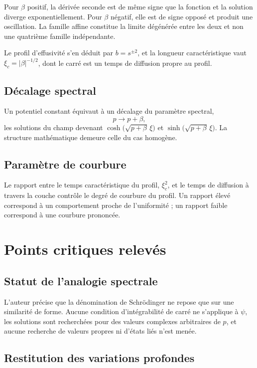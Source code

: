 \documentclass[11pt,a4paper]{article}
\begin{document}
Pour $\beta$ positif, la dérivée seconde est de même signe que la fonction et la solution diverge
exponentiellement. Pour $\beta$ négatif, elle est de signe opposé et produit une oscillation. La
famille affine constitue la limite dégénérée entre les deux et non une quatrième famille indépendante.

Le profil d'effusivité s'en déduit par $b = s^{\pm 2}$, et la longueur caractéristique vaut
$\xi_{c} = |\beta|^{-1/2}$, dont le carré est un temps de diffusion propre au profil.

\subsection{Décalage spectral}

Un potentiel constant équivaut à un décalage du paramètre spectral,
\[ p \longrightarrow p + \beta , \]
les solutions du champ devenant $\cosh\bigl(\sqrt{p+\beta}\,\xi\bigr)$ et
$\sinh\bigl(\sqrt{p+\beta}\,\xi\bigr)$. La structure mathématique demeure celle du cas homogène.

\subsection{Paramètre de courbure}

Le rapport entre le temps caractéristique du profil, $\xi_{c}^{2}$, et le temps de diffusion à travers
la couche contrôle le degré de courbure du profil. Un rapport élevé correspond à un comportement proche
de l'uniformité ; un rapport faible correspond à une courbure prononcée.

\section{Points critiques relevés}

\subsection{Statut de l'analogie spectrale}

L'auteur précise que la dénomination de Schrödinger ne repose que sur une similarité de forme. Aucune
condition d'intégrabilité de carré ne s'applique à $\psi$, les solutions sont recherchées pour des
valeurs complexes arbitraires de $p$, et aucune recherche de valeurs propres ni d'états liés n'est
menée.

\subsection{Restitution des variations profondes}
\end{document}

